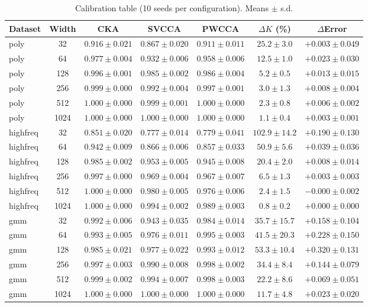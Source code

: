 \documentclass[twoside,11pt]{article}
\begin{document}
\begin{table}[t]
    \centering\footnotesize
    \setlength{\tabcolsep}{4pt}
    \caption{Calibration table (10 seeds per configuration). Means $\pm$ s.d.}
    \label{tab:results}
    \begin{tabular}{lcccccc}
    \toprule
    Dataset & Width & CKA & SVCCA & PWCCA & $\Delta K$ (\%) & $\Delta$Error \\
    \midrule
    poly & 32   & $0.916\pm0.021$ & $0.867\pm0.020$ & $0.911\pm0.011$ & $25.2\pm3.0$ & $+0.003\pm0.049$ \\
    poly & 64   & $0.977\pm0.004$ & $0.932\pm0.006$ & $0.958\pm0.006$ & $12.5\pm1.0$ & $+0.023\pm0.030$ \\
    poly & 128  & $0.996\pm0.001$ & $0.985\pm0.002$ & $0.986\pm0.004$ & $5.2\pm0.5$  & $+0.013\pm0.015$ \\
    poly & 256  & $0.999\pm0.000$ & $0.992\pm0.004$ & $0.997\pm0.001$ & $3.0\pm1.3$  & $+0.008\pm0.004$ \\
    poly & 512  & $1.000\pm0.000$ & $0.999\pm0.001$ & $1.000\pm0.000$ & $2.3\pm0.8$  & $+0.006\pm0.002$ \\
    poly & 1024 & $1.000\pm0.000$ & $1.000\pm0.000$ & $1.000\pm0.000$ & $1.1\pm0.4$  & $+0.003\pm0.001$ \\
    \midrule
    highfreq & 32  & $0.851\pm0.020$ & $0.777\pm0.014$ & $0.779\pm0.041$ & $102.9\pm14.2$ & $+0.190\pm0.130$ \\
    highfreq & 64  & $0.942\pm0.009$ & $0.866\pm0.006$ & $0.857\pm0.033$ & $50.9\pm5.6$   & $+0.039\pm0.036$ \\
    highfreq & 128 & $0.985\pm0.002$ & $0.953\pm0.005$ & $0.945\pm0.008$ & $20.4\pm2.0$   & $+0.008\pm0.014$ \\
    highfreq & 256 & $0.997\pm0.000$ & $0.969\pm0.004$ & $0.967\pm0.007$ & $6.5\pm1.3$    & $+0.003\pm0.003$ \\
    highfreq & 512 & $1.000\pm0.000$ & $0.980\pm0.005$ & $0.976\pm0.006$ & $2.4\pm1.5$    & $-0.000\pm0.002$ \\
    highfreq & 1024 & $1.000\pm0.000$ & $0.994\pm0.002$ & $0.989\pm0.003$ & $0.8\pm0.2$    & $+0.000\pm0.000$ \\
    \midrule
    gmm & 32  & $0.992\pm0.006$ & $0.943\pm0.035$ & $0.984\pm0.014$ & $35.7\pm15.7$ & $+0.158\pm0.104$ \\
    gmm & 64  & $0.993\pm0.005$ & $0.976\pm0.011$ & $0.995\pm0.003$ & $41.5\pm20.3$ & $+0.228\pm0.150$ \\
    gmm & 128 & $0.985\pm0.021$ & $0.977\pm0.022$ & $0.993\pm0.012$ & $53.3\pm10.4$ & $+0.320\pm0.131$ \\
    gmm & 256 & $0.997\pm0.003$ & $0.990\pm0.008$ & $0.998\pm0.002$ & $34.4\pm8.4$  & $+0.144\pm0.079$ \\
    gmm & 512 & $0.999\pm0.002$ & $0.994\pm0.007$ & $0.998\pm0.003$ & $22.2\pm8.6$  & $+0.069\pm0.051$ \\
    gmm & 1024 & $1.000\pm0.000$ & $1.000\pm0.000$ & $1.000\pm0.000$ & $11.7\pm4.8$  & $+0.023\pm0.020$ \\
    \bottomrule
    \end{tabular}
\end{table}
\end{document}
